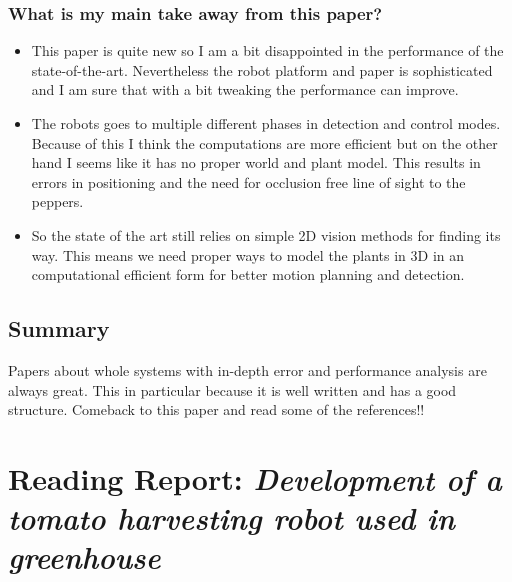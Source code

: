     \subsubsection*{What is my main take away from this paper?}
    \begin{itemize}
        \item This paper is quite new so I am a bit disappointed in the performance of the state-of-the-art.
        Nevertheless the robot platform and paper is sophisticated and I am sure that with a bit tweaking the performance can improve.
        \item The robots goes to multiple different phases in detection and control modes. Because of this I think the 
        computations are more efficient but on the other hand I seems like it has no proper world and plant model. 
        This results in errors in positioning and the need for occlusion free line of sight to the peppers. 
        \item So the state of the art still relies on simple 2D vision methods for finding its way.  
        This means we need proper ways to model the plants in 3D in an computational efficient form for better motion planning and detection.
    \end{itemize}
    
    \subsection*{Summary}
    Papers about whole systems with in-depth error and performance analysis are always great. This in particular because it is well written and has a good structure. 
    Comeback to this paper and read some of the references!!
    

    \newpage
    \section{Reading Report: \emph{Development of a tomato harvesting robot used in greenhouse}}
    \label{sec:Lili2017}
    \cite{Lili2017}
    
